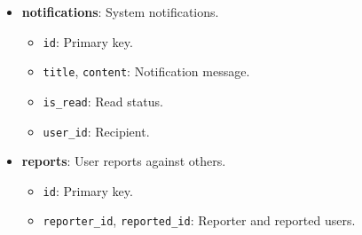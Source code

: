 \documentclass[12pt]{report}
\begin{document}
\begin{itemize}
	\item \textbf{notifications}: System notifications.
	      \begin{itemize}
		      \item \texttt{id}: Primary key.
		      \item \texttt{title}, \texttt{content}: Notification message.
		      \item \texttt{is\_read}: Read status.
		      \item \texttt{user\_id}: Recipient.
	      \end{itemize}

	\item \textbf{reports}: User reports against others.
	      \begin{itemize}
		      \item \texttt{id}: Primary key.
		      \item \texttt{reporter\_id}, \texttt{reported\_id}: Reporter and reported users.
	      \end{itemize}

\end{itemize}
\end{document}
